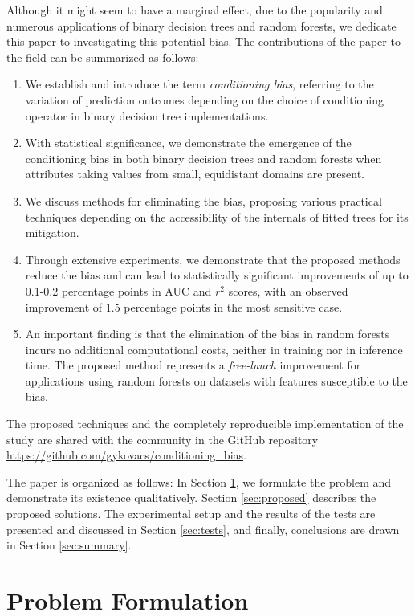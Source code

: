 \documentclass[sn-mathphys]{sn-jnl}%
\theoremstyle{thmstyleone}%
\theoremstyle{thmstyletwo}%
\theoremstyle{thmstylethree}%
\begin{document}
Although it might seem to have a marginal effect, due to the popularity and numerous applications of binary decision trees and random forests, we dedicate this paper to investigating this potential bias.
The contributions of the paper to the field can be summarized as follows:
\begin{enumerate}
\item We establish and introduce the term \emph{conditioning bias}, referring to the variation of prediction outcomes depending on the choice of conditioning operator in binary decision tree implementations.
\item With statistical significance, we demonstrate the emergence of the conditioning bias in both binary decision trees and random forests when attributes taking values from small, equidistant domains are present.
\item We discuss methods for eliminating the bias, proposing various practical techniques depending on the accessibility of the internals of fitted trees for its mitigation.
\item Through extensive experiments, we demonstrate that the proposed methods reduce the bias and can lead to statistically significant improvements of up to 0.1-0.2 percentage points in AUC and $r^2$ scores, with an observed improvement of 1.5 percentage points in the most sensitive case.
\item An important finding is that the elimination of the bias in random forests incurs no additional computational costs, neither in training nor in inference time. The proposed method represents a \emph{free-lunch} improvement for applications using random forests on datasets with features susceptible to the bias.
\end{enumerate}
The proposed techniques and the completely reproducible implementation of the study are shared with the community in the GitHub repository \url{https://github.com/gykovacs/conditioning_bias}.

The paper is organized as follows: In Section \ref{sec:problem}, we formulate the problem and demonstrate its existence qualitatively. Section \ref{sec:proposed} describes the proposed solutions. The experimental setup and the results of the tests are presented and discussed in Section \ref{sec:tests}, and finally, conclusions are drawn in Section \ref{sec:summary}.

\section{Problem Formulation}
\label{sec:problem}
\end{document}
